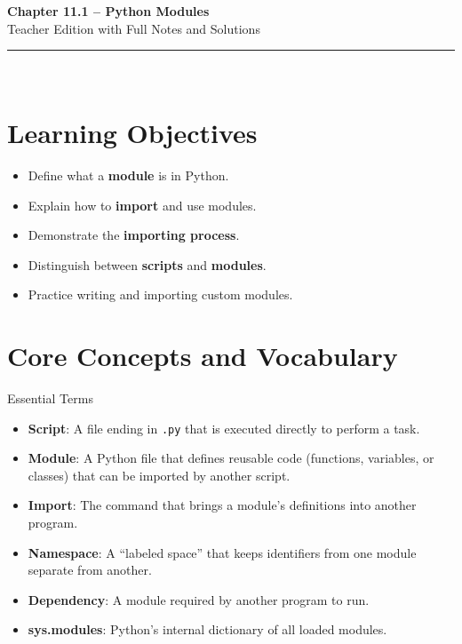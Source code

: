 \documentclass[12pt]{article}
\begin{document}
\begin{center}
  \vspace*{1cm}
  {\Huge \textbf{Chapter 11.1 – Python Modules}}\\[0.5cm]
  {\Large Teacher Edition with Full Notes and Solutions}\\[1cm]
  \rule{\textwidth}{0.4pt}\\[1cm]
\end{center}

\section{Learning Objectives}
\begin{itemize}
  \item Define what a \textbf{module} is in Python.
  \item Explain how to \textbf{import} and use modules.
  \item Demonstrate the \textbf{importing process}.
  \item Distinguish between \textbf{scripts} and \textbf{modules}.
  \item Practice writing and importing custom modules.
\end{itemize}

\section{Core Concepts and Vocabulary}

\begin{conceptbox}{Essential Terms}
\begin{itemize}
  \item \textbf{Script}: A file ending in \texttt{.py} that is executed directly to perform a task.
  \item \textbf{Module}: A Python file that defines reusable code (functions, variables, or classes) that can be imported by another script.
  \item \textbf{Import}: The command that brings a module’s definitions into another program.
  \item \textbf{Namespace}: A “labeled space” that keeps identifiers from one module separate from another.
  \item \textbf{Dependency}: A module required by another program to run.
  \item \textbf{sys.modules}: Python’s internal dictionary of all loaded modules.
\end{itemize}
\end{conceptbox}
\end{document}
